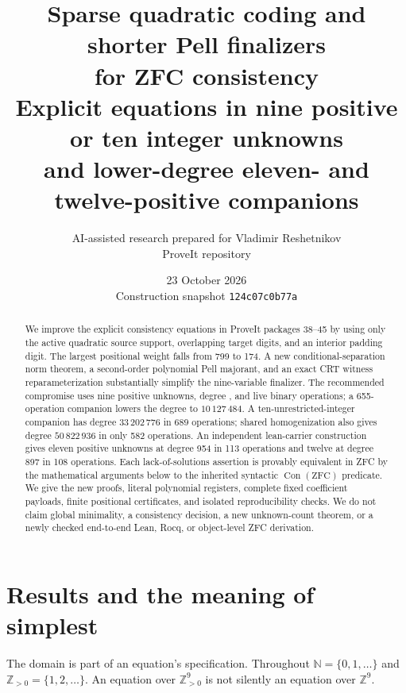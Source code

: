 \documentclass[11pt]{article}
\title{Sparse quadratic coding and shorter Pell finalizers\\for ZFC consistency\\[0.5em]\large Explicit equations in nine positive or ten integer unknowns\\and lower-degree eleven- and twelve-positive companions}
\author{AI-assisted research prepared for Vladimir Reshetnikov\\ProveIt repository}
\date{23 October 2026\\\small Construction snapshot \texttt{124c07c0b77a}}
\newcommand{\N}{\mathbb N}\newcommand{\Z}{\mathbb Z}
\newcommand{\Pos}{\mathbb Z_{>0}}\newcommand{\Con}{\operatorname{Con}}
\begin{document}
\maketitle
\begin{abstract}
We improve the explicit consistency equations in ProveIt packages 38--45
by using only the active quadratic source support, overlapping target digits,
and an interior padding digit. The largest positional weight falls from 799
to 174. A new conditional-separation norm theorem, a second-order polynomial
Pell majorant, and an exact CRT witness reparameterization substantially
simplify the nine-variable finalizer. The recommended compromise
uses nine positive unknowns, degree \NineDegree{}, and \NineOps{} live binary
operations; a 655-operation companion lowers the degree to $10\,127\,484$. A ten-unrestricted-integer companion has degree $33\,202\,776$
in 689 operations; shared homogenization also gives degree $50\,822\,936$
in only 582 operations. An independent lean-carrier construction gives
eleven positive unknowns at degree 954 in 113 operations and twelve at
degree 897 in 108 operations. Each lack-of-solutions assertion is
provably equivalent in ZFC by the mathematical arguments below to the inherited syntactic
$\Con(\mathrm{ZFC})$ predicate. We give the new proofs, literal polynomial
registers, complete fixed coefficient payloads, finite positional certificates,
and isolated reproducibility checks. We do not claim global minimality,
a consistency decision, a new unknown-count theorem, or a newly checked
end-to-end Lean, Rocq, or object-level ZFC derivation.
\end{abstract}
\tableofcontents
\newpage

\section{Results and the meaning of simplest}
The domain is part of an equation's specification. Throughout
$\N=\{0,1,\ldots\}$ and $\Pos=\{1,2,\ldots\}$. An equation over
$\Pos^9$ is not silently an equation over $\Z^9$.
\end{document}
